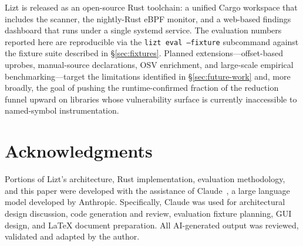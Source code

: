 \documentclass[conference]{IEEEtran}
\begin{document}
Lizt is released as an open-source Rust toolchain: a unified Cargo workspace that includes the scanner, the nightly-Rust eBPF monitor, and a web-based findings dashboard that runs under a single systemd service. The evaluation numbers reported here are reproducible via the \texttt{lizt eval --fixture} subcommand against the fixture suite described in \S\ref{sec:fixtures}. Planned extensions---offset-based uprobes, manual-source declarations, OSV enrichment, and large-scale empirical benchmarking---target the limitations identified in \S\ref{sec:future-work} and, more broadly, the goal of pushing the runtime-confirmed fraction of the reduction funnel upward on libraries whose vulnerability surface is currently inaccessible to named-symbol instrumentation.
\section*{Acknowledgments}

Portions of Lizt's architecture, Rust implementation, evaluation methodology, and this paper were developed with the assistance of Claude~\cite{claude}, a large language model developed by Anthropic. Specifically, Claude was used for architectural design discussion, code generation and review, evaluation fixture planning, GUI design, and \LaTeX{} document preparation. All AI-generated output was reviewed, validated and adapted by the author.



\end{document}

